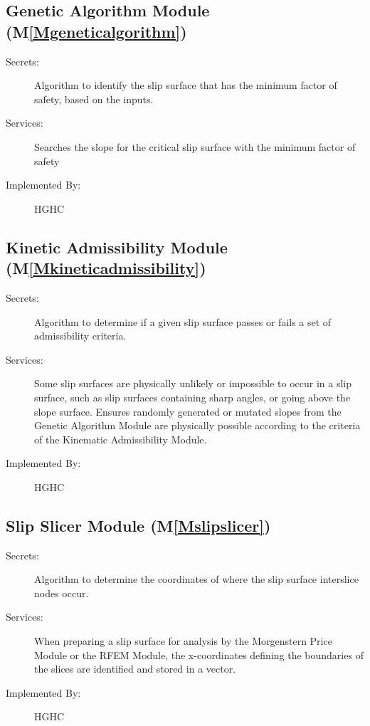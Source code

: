 \documentclass[12pt]{article}
\begin{document}
\subsection{Genetic Algorithm Module (M\ref{Mgeneticalgorithm})}
\label{Sec:GAM()}
\begin{description}
\item[Secrets:]Algorithm to identify the slip surface that has the minimum factor of safety, based on the inputs.
\item[Services:]Searches the slope for the critical slip surface with the minimum factor of safety
\item[Implemented By:]HGHC
\end{description}
\subsection{Kinetic Admissibility Module (M\ref{Mkineticadmissibility})}
\label{Sec:KAM()}
\begin{description}
\item[Secrets:]Algorithm to determine if a given slip surface passes or fails a set of admissibility criteria.
\item[Services:]Some slip surfaces are physically unlikely or impossible to occur in a slip surface, such as slip surfaces containing sharp angles, or going above the slope surface. Ensures randomly generated or mutated slopes from the Genetic Algorithm Module are physically possible according to the criteria of the Kinematic Admissibility Module.
\item[Implemented By:]HGHC
\end{description}
\subsection{Slip Slicer Module (M\ref{Mslipslicer})}
\label{Sec:SSM()}
\begin{description}
\item[Secrets:]Algorithm to determine the coordinates of where the slip surface interslice nodes occur.
\item[Services:]When preparing a slip surface for analysis by the Morgenstern Price Module or the RFEM Module, the x-coordinates defining the boundaries of the slices are identified and stored in a vector.
\item[Implemented By:]HGHC
\end{description}
\end{document}
